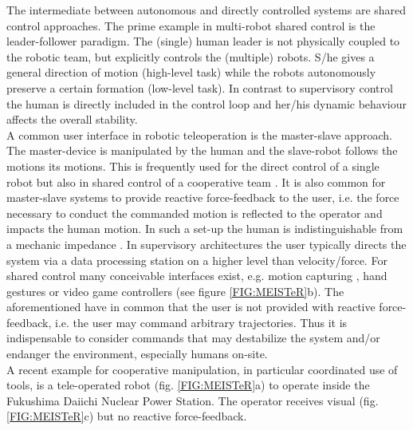 \documentclass[a4paper,twoside, openright,12pt]{report}
\begin{document}
The intermediate between autonomous and directly controlled systems are shared control approaches. The prime example in multi-robot shared control is the leader-follower paradigm. The (single) human leader is not physically coupled to the robotic team, but explicitly controls the (multiple) robots. S/he gives a general direction of motion (high-level task) while the robots autonomously preserve a certain formation (low-level task). In contrast to supervisory control the human is directly included in the control loop and her/his dynamic behaviour affects the overall stability.\\
A common user interface in robotic teleoperation is the master-slave approach. The master-device is manipulated by the human and the slave-robot follows the motions its motions. This is frequently used for the direct control of a single robot but also in shared control of a cooperative team \cite{Lee_05}. It is also common for master-slave systems to provide reactive force-feedback to the user, i.e. the force necessary to conduct the commanded motion is reflected to the operator and impacts the human motion. In such a set-up the human is indistinguishable from a mechanic impedance \cite{Hogan_89}. In supervisory architectures the user typically directs the system via a data processing station on a higher level than velocity/force. For shared control many conceivable interfaces exist, e.g. motion capturing \cite{Sieber_15}, hand gestures \cite{Gioioso_2014} or video game controllers (see figure \ref{FIG:MEISTeR}b). The aforementioned have in common that the user is not provided with reactive force-feedback, i.e. the user may command arbitrary trajectories. Thus it is indispensable to consider commands that may destabilize the system and/or endanger the environment, especially humans on-site.\\
A recent example for cooperative manipulation, in particular coordinated use of tools, is a tele-operated robot (fig. \ref{FIG:MEISTeR}a) to operate inside the Fukushima Daiichi Nuclear Power Station. The operator receives visual (fig. \ref{FIG:MEISTeR}c) but no reactive force-feedback.\\
\end{document}
